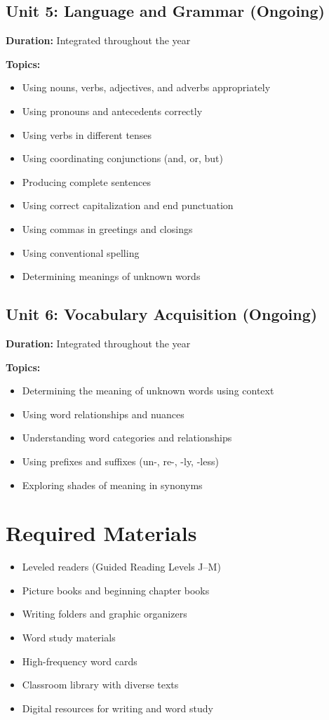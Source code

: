 \documentclass[11pt,letterpaper]{report}
\begin{document}
\subsection{Unit 5: Language and Grammar (Ongoing)}

\textbf{Duration:} Integrated throughout the year

\textbf{Topics:}
\begin{itemize}
    \item Using nouns, verbs, adjectives, and adverbs appropriately
    \item Using pronouns and antecedents correctly
    \item Using verbs in different tenses
    \item Using coordinating conjunctions (and, or, but)
    \item Producing complete sentences
    \item Using correct capitalization and end punctuation
    \item Using commas in greetings and closings
    \item Using conventional spelling
    \item Determining meanings of unknown words
\end{itemize}

\subsection{Unit 6: Vocabulary Acquisition (Ongoing)}

\textbf{Duration:} Integrated throughout the year

\textbf{Topics:}
\begin{itemize}
    \item Determining the meaning of unknown words using context
    \item Using word relationships and nuances
    \item Understanding word categories and relationships
    \item Using prefixes and suffixes (un-, re-, -ly, -less)
    \item Exploring shades of meaning in synonyms
\end{itemize}

\section{Required Materials}

\begin{itemize}
    \item Leveled readers (Guided Reading Levels J--M)
    \item Picture books and beginning chapter books
    \item Writing folders and graphic organizers
    \item Word study materials
    \item High-frequency word cards
    \item Classroom library with diverse texts
    \item Digital resources for writing and word study
\end{itemize}
\end{document}
